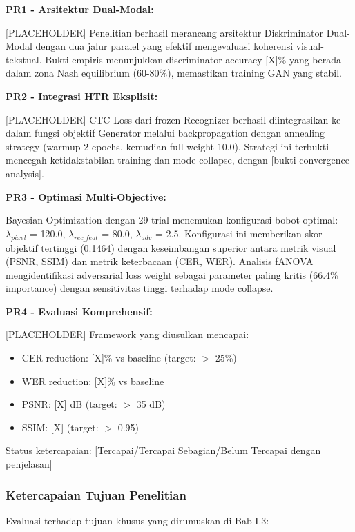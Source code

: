 \documentclass[12pt,a4paper]{article}
\begin{document}
\textbf{PR1 - Arsitektur Dual-Modal:}

[PLACEHOLDER] Penelitian berhasil merancang arsitektur Diskriminator Dual-Modal dengan dua jalur paralel yang efektif mengevaluasi koherensi visual-tekstual. Bukti empiris menunjukkan discriminator accuracy [X]\% yang berada dalam zona Nash equilibrium (60-80\%), memastikan training GAN yang stabil.

\textbf{PR2 - Integrasi HTR Eksplisit:}

[PLACEHOLDER] CTC Loss dari frozen Recognizer berhasil diintegrasikan ke dalam fungsi objektif Generator melalui backpropagation dengan annealing strategy (warmup 2 epochs, kemudian full weight 10.0). Strategi ini terbukti mencegah ketidakstabilan training dan mode collapse, dengan [bukti convergence analysis].

\textbf{PR3 - Optimasi Multi-Objective:}

Bayesian Optimization dengan 29 trial menemukan konfigurasi bobot optimal: $\lambda_{pixel}$ = 120.0, $\lambda_{rec\_feat}$ = 80.0, $\lambda_{adv}$ = 2.5. Konfigurasi ini memberikan skor objektif tertinggi (0.1464) dengan keseimbangan superior antara metrik visual (PSNR, SSIM) dan metrik keterbacaan (CER, WER). Analisis fANOVA mengidentifikasi adversarial loss weight sebagai parameter paling kritis (66.4\% importance) dengan sensitivitas tinggi terhadap mode collapse.

\textbf{PR4 - Evaluasi Komprehensif:}

[PLACEHOLDER] Framework yang diusulkan mencapai:
\begin{itemize}[nosep]
    \item CER reduction: [X]\% vs baseline (target: $>$ 25\%)
    \item WER reduction: [X]\% vs baseline
    \item PSNR: [X] dB (target: $>$ 35 dB)
    \item SSIM: [X] (target: $>$ 0.95)
\end{itemize}

Status ketercapaian: [Tercapai/Tercapai Sebagian/Belum Tercapai dengan penjelasan]

\subsubsection{Ketercapaian Tujuan Penelitian}

Evaluasi terhadap tujuan khusus yang dirumuskan di Bab I.3:
\end{document}
